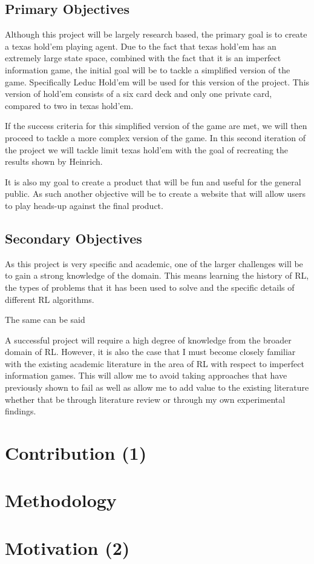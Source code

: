 \subsection{Primary Objectives}\label{subsec:primaryObjectives}

Although this project will be largely research based, the primary goal is to create a texas hold'em
playing agent.
Due to the fact that texas hold'em has an extremely large state space, combined with the fact that it
is an imperfect information game, the initial goal will be to tackle a simplified version of the game.
Specifically Leduc Hold'em will be used for this version of the project.
This version of hold'em consists of a six card deck and only one private card, compared to two in texas hold'em.

If the success criteria for this simplified version of the game are met, we will then proceed to tackle
a more complex version of the game.
In this second iteration of the project we will tackle limit texas hold'em with the goal of recreating
the results shown by Heinrich.

It is also my goal to create a product that will be fun and useful for the general public.
As such another objective will be to create a website that will allow users to play heads-up against the final product.

\subsection{Secondary Objectives}\label{subsec:secondaryObjectives}
As this project is very specific and academic, one of the larger challenges will be to gain a strong knowledge
of the domain.
This means learning the history of RL, the types of problems that it has been used to solve and the specific details of
different RL algorithms.

The same can be said

A successful project will require a high degree of knowledge from the broader domain of RL. However, it is also the case
that I must become closely familiar with the existing academic literature in the area of RL with respect to imperfect
information games.
This will allow me to avoid taking approaches that have previously shown to fail as well as allow me to add value to
the existing literature whether that be through literature review or through my own experimental findings.


\section{Contribution (1)}\label{sec:contribution}

\section{Methodology}\label{sec:methodology}

\section{Motivation (2)}\label{sec:Motivation}